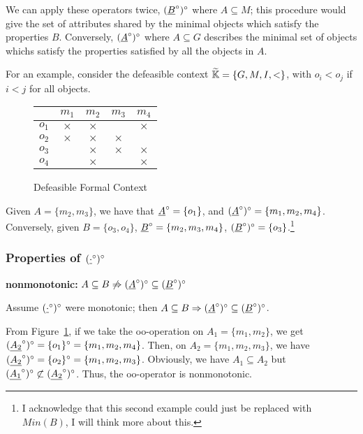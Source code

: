 \documentclass[11pt]{article}
\begin{document}
We can apply these operators twice, $(\underline{B}^\circ)^\circ$ where $A\subseteq M$; this procedure would give the set of attributes shared by the minimal objects which satisfy the properties $B$. Conversely, $(\underline{A}^\circ)^\circ$ where $A\subseteq G$ describes the minimal set of objects whichs satisfy the properties satisfied by all the objects in $A$.  

For an example, consider the defeasible context $\widetilde{\mathbb{K}} = \{G,M,I,<\}$, with $o_i < o_j$ if $i < j$ for all objects. 
\begin{figure}[h]
  \begin{center}
    \begin{tabular}{c|cccc}
              & $m_1$     & $m_2$     & $m_3$     & $m_4$     \\ \hline
        $o_1$ & $\times$  & $\times$  &           & $\times$  \\ 
        $o_2$ & $\times$  & $\times$  & $\times$  &           \\ 
        $o_3$ &           & $\times$  & $\times$  & $\times$  \\ 
        $o_4$ &           & $\times$  &           & $\times$ 
    \end{tabular}
  \end{center}
  \caption{Defeasible Formal Context}
  \label{Figure:Initial Defeasible Formal Context}
\end{figure}


Given $A = \{m_2, m_3\}$, we have that $\underline{A}^\circ = \{o_1\}$, and $(\underline{A}^\circ)^\circ = \{m_1, m_2, m_4\}$. Conversely, given $B = \{o_3, o_4\}$, $\underline{B}^\circ = \{m_2, m_3, m_4\}$, $(\underline{B}^\circ)^\circ = \{o_3\}$.\footnote[1]{I acknowledge that this second example could just be replaced with $Min(B)$, I will think more about this. } 


\subsubsection{Properties of $(\underline{\cdot}^\circ)^\circ$}

\textbf{nonmonotonic:} $A \subseteq B \not \Rightarrow (\underline{A}^\circ)^\circ \subseteq (\underline{B}^\circ)^\circ$

Assume $(\underline{\cdot}^\circ)^\circ$ were monotonic; then $A\subseteq B \Rightarrow (\underline{A}^\circ)^\circ \subseteq (\underline{B}^\circ)^\circ$.

From Figure~\ref{Figure:Initial Defeasible Formal Context}, if we take the oo-operation on $A_1 = \{m_1, m_2\}$, we get $(\underline{A_2}^\circ)^\circ = \{o_1\}^\circ = \{m_1, m_2, m_4\}$. Then, on $A_2 = \{m_1, m_2, m_3\}$, we have $(\underline{A_2}^\circ)^\circ = \{o_2\}^\circ = \{m_1, m_2, m_3\}$. Obviously, we have $A_1 \subseteq A_2$ but $(\underline{A_1}^\circ)^\circ \not \subset (\underline{A_2}^\circ)^\circ$. Thus, the oo-operator is nonmonotonic. 
\end{document}
